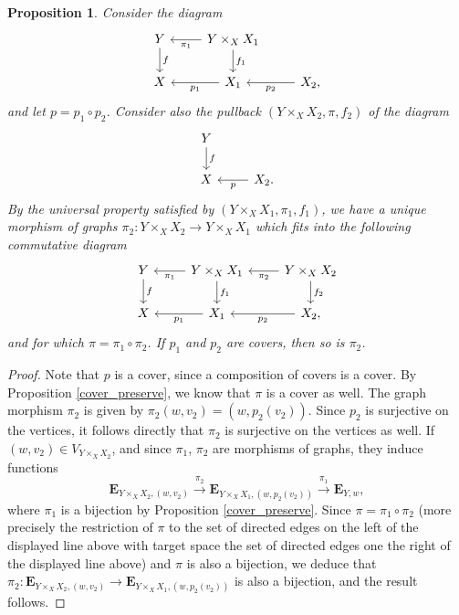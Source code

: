 \documentclass[11pt]{amsart}
\newtheorem{proposition}[theorem]{Proposition}
\numberwithin{equation}{section}
\theoremstyle{remark}
\begin{document}
\begin{proposition} \label{cover_fiber}
Consider the diagram
\begin{equation*}
\begin{tikzcd}
Y \arrow["f",d] &\arrow["\pi_{1}",l] \arrow["f_{1}",d] Y \times_{X}X_{1}  & \\
X & \arrow["p_{1}",l] X_{1} & \arrow["p_{2}",l]X_{2},
\end{tikzcd}
\end{equation*}
and let $p = p_{1} \circ p_{2}$.  Consider also the pullback $(Y \times_{X}X_{2},\pi,f_{2})$ of the diagram
\begin{equation*}
\begin{tikzcd}
Y \arrow["f",d] & \\
X & \arrow["p",l] X_{2}.
\end{tikzcd}
\end{equation*}
By the universal property satisfied by $(Y \times_{X}X_{1},\pi_{1},f_{1})$, we have a unique morphism of graphs $\pi_{2}:Y\times_{X}X_{2} \rightarrow Y \times_{X}X_{1}$ which fits into the following commutative diagram
\begin{equation*}
\begin{tikzcd}
Y \arrow["f",d] &\arrow["\pi_{1}",l] \arrow["f_{1}",d] Y \times_{X}X_{1}  & \arrow["\pi_{2}",l] \arrow["f_{2}",d] Y \times_{X}X_{2} \\
X & \arrow["p_{1}",l] X_{1} & \arrow["p_{2}",l]X_{2},
\end{tikzcd}
\end{equation*}
and for which $\pi = \pi_{1} \circ \pi_{2}$.  If $p_{1}$ and $p_{2}$ are covers, then so is $\pi_{2}$.
\end{proposition}
\begin{proof}
Note that $p$ is a cover, since a composition of covers is a cover.  By Proposition \ref{cover_preserve}, we know that $\pi$ is a cover as well.  The graph morphism $\pi_{2}$ is given by $\pi_{2}(w,v_{2}) = (w,p_{2}(v_{2}))$.  Since $p_{2}$ is surjective on the vertices, it follows directly that $\pi_{2}$ is surjective on the vertices as well.  If $(w,v_{2})\in V_{Y \times_{X}X_{2}}$, and since $\pi_{1}$, $\pi_{2}$ are morphisms of graphs, they induce functions
$$\mathbf{E}_{Y \times_{X}X_{2},(w,v_{2})} \stackrel{\pi_{2}}{\longrightarrow} \mathbf{E}_{Y \times_{X}X_{1},(w,p_{2}(v_{2}))} \stackrel{\pi_{1}}{\longrightarrow} \mathbf{E}_{Y,w},$$
where $\pi_{1}$ is a bijection by Proposition \ref{cover_preserve}.  Since $\pi = \pi_{1} \circ \pi_{2}$ (more precisely the restriction of $\pi$ to the set of directed edges on the left of the displayed line above with target space the set of directed edges one the right of the displayed line above) and $\pi$ is also a bijection, we deduce that $\pi_{2}:  \mathbf{E}_{Y \times_{X}X_{2},(w,v_{2})} \rightarrow \mathbf{E}_{Y \times_{X}X_{1},(w,p_{2}(v_{2}))}$ is also a bijection, and the result follows.


\end{proof}
\end{document}
